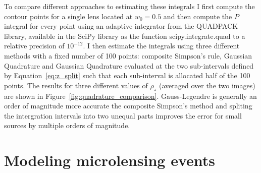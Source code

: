 \documentclass[12pt,dvipsnames]{report}
\newcommand{\ssf}[1]{\textsf{#1}}
\begin{document}
To compare different approaches to estimating these integrals I first compute the contour points 
for a single lens located at $w_0=0.5$ and then compute the $P$ integral for every point 
using an adaptive integrator from the \ssf{QUADPACK} library, available in the SciPy library as 
the function \ssf{scipy.integrate.quad} to a relative precision of $10^{-12}$. I then estimate 
the integrals using three different methods with a fixed number of 100 points: composite 
Simpson's rule, Gaussian Quadrature and Gaussian Quadrature evaluated at the two sub-intervals
defined by Equation~\ref{eq:z_split} such that each sub-interval is allocated half of the 100 
points. The results for three different values of $\rho_\star$ (averaged over the two images) 
are shown in Figure~\ref{fig:quadrature_comparison}. Gauss-Legendre is generally an order of 
magnitude more accurate the composite Simpson's method and spliting the intergration intervals
into two unequal parts improves the error for small sources by multiple orders of magnitude.




%
%
\chapter{Modeling microlensing events}
\label{ch:microlensing_modeling}
\end{document}
